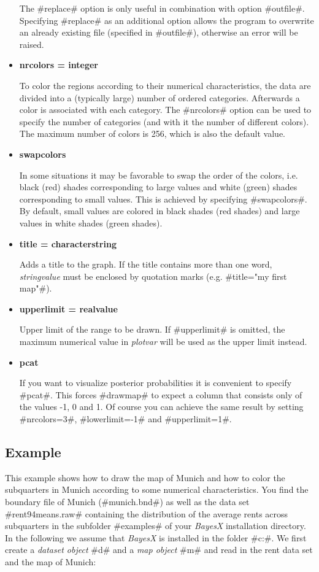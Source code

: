 \begin{itemize}
The #replace# option is only useful in combination with option
#outfile#. Specifying #replace# as an additional option allows the
program to overwrite an already existing file (specified in
#outfile#), otherwise an error will be raised. \item {\bf nrcolors
= integer}

To color the regions according to their numerical characteristics,
the data are divided into a (typically large) number of ordered
categories. Afterwards a color is associated with each category.
The #nrcolors# option can be used to specify the number of
categories (and with it the number of different colors). The
maximum number of colors is 256, which is also the default value.
\item {\bf swapcolors}

In some situations it may be favorable to swap the order of the
colors, i.e. black (red) shades corresponding to large values and
white (green) shades corresponding to small values. This is
achieved by specifying #swapcolors#. By default, small values are
colored in black shades (red shades) and large values in white
shades (green shades). \item {\bf title = characterstring}

Adds a title to the graph. If the title contains more than one
word, {\em stringvalue} must be enclosed by quotation marks (e.g.
#title="my first map"#). \item {\bf upperlimit = realvalue}

Upper limit of the range to be drawn. If #upperlimit# is omitted,
the maximum numerical value in {\em plotvar} will be used as the
upper limit instead.
\item {\bf pcat}

If you want to visualize posterior probabilities it is convenient
to specify #pcat#. This forces #drawmap# to expect a column that
consists only of the values -1, 0 and 1. Of course you can achieve
the same result by setting #nrcolors=3#, #lowerlimit=-1# and
#upperlimit=1#.
\end{itemize}

\subsection*{Example}

This example shows how to draw the map of Munich and how to color
the subquarters in Munich according to some numerical
characteristics. You find the boundary file of Munich
(#munich.bnd#) as well as the data set #rent94means.raw#
containing the distribution of the average rents across
subquarters in the subfolder #examples# of your {\em BayesX}
installation directory. In the following we assume that {\em
BayesX} is installed in the folder #c:\bayesx#. We
first create a {\em dataset object} #d# and a {\em map object} #m#
and read in the rent data set and the map of Munich:

